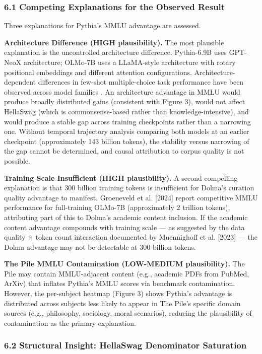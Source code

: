 
\subsubsection{6.1 Competing Explanations for the Observed Result}

Three explanations for Pythia's MMLU advantage are assessed.

\textbf{Architecture Difference (HIGH plausibility).} The most plausible explanation is the uncontrolled architecture difference. Pythia-6.9B uses GPT-NeoX architecture; OLMo-7B uses a LLaMA-style architecture with rotary positional embeddings and different attention configurations. Architecture-dependent differences in few-shot multiple-choice task performance have been observed across model families \citep{Touvron2023LLaMA}. An architecture advantage in MMLU would produce broadly distributed gains (consistent with Figure 3), would not affect HellaSwag (which is commonsense-based rather than knowledge-intensive), and would produce a stable gap across training checkpoints rather than a narrowing one. Without temporal trajectory analysis comparing both models at an earlier checkpoint (approximately 143 billion tokens), the stability versus narrowing of the gap cannot be determined, and causal attribution to corpus quality is not possible.

\textbf{Training Scale Insufficient (HIGH plausibility).} A second compelling explanation is that 300 billion training tokens is insufficient for Dolma's curation quality advantage to manifest. Groeneveld et al. [2024] report competitive MMLU performance for full-training OLMo-7B (approximately 2 trillion tokens), attributing part of this to Dolma's academic content inclusion. If the academic content advantage compounds with training scale --- as suggested by the data quality $\times$ token count interaction documented by Muennighoff et al. [2023] --- the Dolma advantage may not be detectable at 300 billion tokens.

\textbf{The Pile MMLU Contamination (LOW-MEDIUM plausibility).} The Pile may contain MMLU-adjacent content (e.g., academic PDFs from PubMed, ArXiv) that inflates Pythia's MMLU scores via benchmark contamination. However, the per-subject heatmap (Figure 3) shows Pythia's advantage is distributed across subjects less likely to appear in The Pile's specific domain sources (e.g., philosophy, sociology, moral scenarios), reducing the plausibility of contamination as the primary explanation.

\subsubsection{6.2 Structural Insight: HellaSwag Denominator Saturation}

